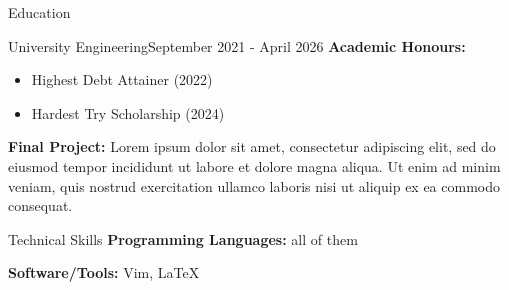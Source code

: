 \documentclass{../classes/resume}
\begin{document}
	\begin{section}{Education}
		\begin{subsection}{University \divider Engineering}{September 2021 - April 2026}
			\textbf{Academic Honours:}
			\begin{itemize}
                \item Highest Debt Attainer (2022)
                \item Hardest Try Scholarship (2024) 
			\end{itemize}
			
			\textbf{Final Project:} Lorem ipsum dolor sit amet, consectetur adipiscing elit, sed do eiusmod tempor incididunt ut labore et dolore magna aliqua. Ut enim ad minim veniam, quis nostrud exercitation ullamco laboris nisi ut aliquip ex ea commodo consequat.
			
		\end{subsection}
	\end{section}
	
	
	\begin{section}{Technical Skills}
		\textbf{Programming Languages:} all of them

		\textbf{Software/Tools:} Vim, LaTeX
		
	\end{section}
\end{document}
